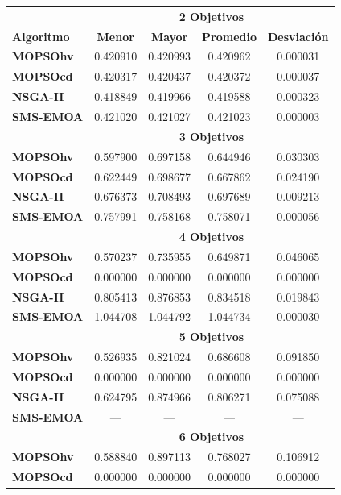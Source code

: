 \begin{longtable}{|l|cc|cc|} 
\hline
    & \multicolumn{4}{|c|}{\textbf{2 Objetivos}} \\ 
	\textbf{Algoritmo} & \textbf{Menor} & \textbf{Mayor} & \textbf{Promedio} & \textbf{Desviaci\'on} \\  \hline \hline
	\textbf{MOPSOhv} & 0.420910 & 0.420993 & 0.420962 & 0.000031\\ 
	\textbf{MOPSOcd} & 0.420317 & 0.420437 & 0.420372 & 0.000037\\ 
	\textbf{NSGA-II} & 0.418849 & 0.419966 & 0.419588 & 0.000323\\  
	\textbf{SMS-EMOA}& 0.421020 & 0.421027 & 0.421023 & 0.000003\\  
	\hline\hline
    & \multicolumn{4}{|c|}{\textbf{3  Objetivos}} \\ 
	\hline\hline
	\textbf{MOPSOhv} & 0.597900 & 0.697158 & 0.644946 & 0.030303\\ 
	\textbf{MOPSOcd} & 0.622449 & 0.698677 & 0.667862 & 0.024190\\ 
	\textbf{NSGA-II} & 0.676373 & 0.708493 & 0.697689 & 0.009213\\  
	\textbf{SMS-EMOA}& 0.757991 & 0.758168 & 0.758071 & 0.000056\\
	\hline\hline
    & \multicolumn{4}{|c|}{\textbf{4 Objetivos}} \\ 
	\hline\hline
	\textbf{MOPSOhv} &0.570237 & 0.735955 & 0.649871 & 0.046065 \\ 
	\textbf{MOPSOcd} &0.000000 & 0.000000 & 0.000000 & 0.000000 \\ 
	\textbf{NSGA-II} &0.805413 & 0.876853 & 0.834518 & 0.019843 \\  
	\textbf{SMS-EMOA}&1.044708 & 1.044792 & 1.044734 & 0.000030 \\ 
	\hline\hline
 & \multicolumn{4}{|c|}{\textbf{5 Objetivos}} \\ 
	\hline\hline
	\textbf{MOPSOhv} &0.526935 & 0.821024 & 0.686608 & 0.091850 \\ 
	\textbf{MOPSOcd} &0.000000 & 0.000000 & 0.000000 & 0.000000 \\ 
	\textbf{NSGA-II} &0.624795 & 0.874966 & 0.806271 & 0.075088 \\  
	\textbf{SMS-EMOA}& --- & --- & --- & --- \\
	\hline\hline
& \multicolumn{4}{|c|}{\textbf{6 Objetivos}} \\ 
	\hline\hline
	\textbf{MOPSOhv} &0.588840 & 0.897113 & 0.768027 & 0.106912 \\ 
	\textbf{MOPSOcd} &0.000000 & 0.000000 & 0.000000 & 0.000000 \\ 

\end{longtable}
